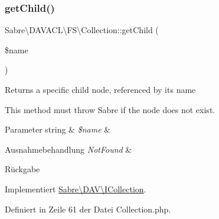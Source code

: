 \mbox{\label{class_sabre_1_1_d_a_v_a_c_l_1_1_f_s_1_1_collection_adeea47e4d71cd6ae12100e49b46b1d2b}} 
\subsubsection{\texorpdfstring{get\+Child()}{getChild()}}
{\footnotesize\ttfamily Sabre\textbackslash{}\+D\+A\+V\+A\+C\+L\textbackslash{}\+F\+S\textbackslash{}\+Collection\+::get\+Child (\begin{DoxyParamCaption}\item[{}]{\$name }\end{DoxyParamCaption})}

Returns a specific child node, referenced by its name

This method must throw Sabre if the node does not exist.


\begin{DoxyParams}[1]{Parameter}
string & {\em \$name} & \\
\hline
\end{DoxyParams}

\begin{DoxyExceptions}{Ausnahmebehandlung}
{\em Not\+Found} & \\
\hline
\end{DoxyExceptions}
\begin{DoxyReturn}{Rückgabe}

\end{DoxyReturn}


Implementiert \mbox{\hyperlink{interface_sabre_1_1_d_a_v_1_1_i_collection_a09f82b07550611752abb149f468b89c2}{Sabre\textbackslash{}\+D\+A\+V\textbackslash{}\+I\+Collection}}.



Definiert in Zeile 61 der Datei Collection.\+php.

\mbox{\label{class_sabre_1_1_d_a_v_a_c_l_1_1_f_s_1_1_collection_ab8caea96564eb502945e9151918b91cb}} 
